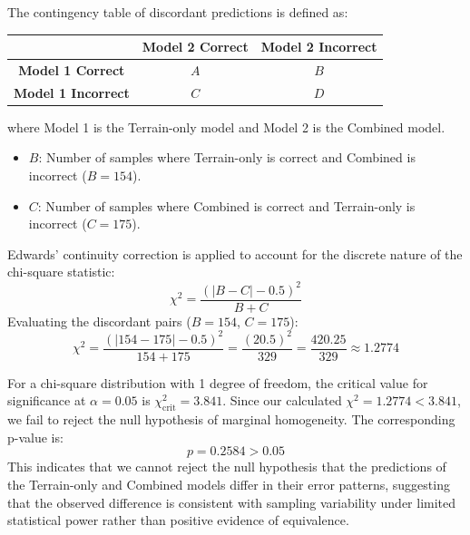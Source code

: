 The contingency table of discordant predictions is defined as:
\begin{center}
\begin{tabular}{|c|c|c|}
\hline
 & \textbf{Model 2 Correct} & \textbf{Model 2 Incorrect} \\
\hline
\textbf{Model 1 Correct} & $A$ & $B$ \\
\hline
\textbf{Model 1 Incorrect} & $C$ & $D$ \\
\hline
\end{tabular}
\end{center}
where Model 1 is the Terrain-only model and Model 2 is the Combined model.
\begin{itemize}
    \item $B$: Number of samples where Terrain-only is correct and Combined is incorrect ($B = 154$).
    \item $C$: Number of samples where Combined is correct and Terrain-only is incorrect ($C = 175$).
\end{itemize}

Edwards' continuity correction is applied to account for the discrete nature of the chi-square statistic:
\begin{equation}
    \chi^2 = \frac{(|B - C| - 0.5)^2}{B + C}
\end{equation}
Evaluating the discordant pairs ($B = 154$, $C = 175$):
\begin{equation}
    \chi^2 = \frac{(|154 - 175| - 0.5)^2}{154 + 175} = \frac{(20.5)^2}{329} = \frac{420.25}{329} \approx 1.2774
\end{equation}

For a chi-square distribution with 1 degree of freedom, the critical value for significance at $\alpha = 0.05$ is $\chi^2_{\text{crit}} = 3.841$. Since our calculated $\chi^2 = 1.2774 < 3.841$, we fail to reject the null hypothesis of marginal homogeneity. The corresponding p-value is:
\begin{equation}
    p = 0.2584 > 0.05
\end{equation}
This indicates that we cannot reject the null hypothesis that the predictions of the Terrain-only and Combined models differ in their error patterns, suggesting that the observed difference is consistent with sampling variability under limited statistical power rather than positive evidence of equivalence.

